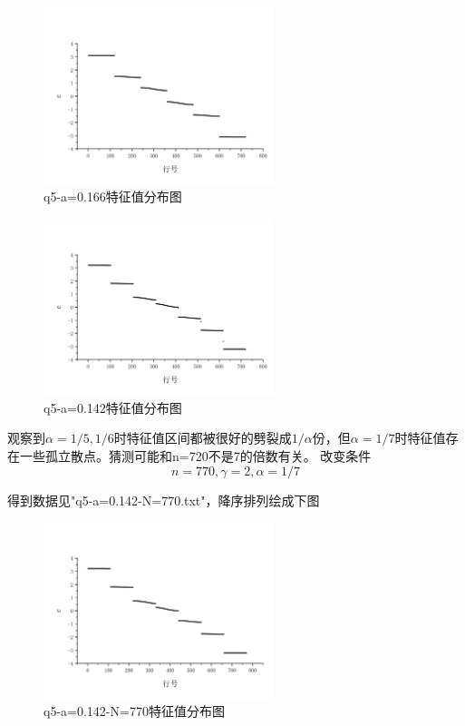 \documentclass[10pt, a4paper]{article}
\begin{document}
    \begin{figure}[H]
        \centering
        \includegraphics[width=0.6\textwidth]{q5-a=0.166特征值分布图.jpg}
        \caption{q5-a=0.166特征值分布图}\label{fig:q5-a=0.166特征值分布图}
    \end{figure}

    \begin{figure}[H]
        \centering
        \includegraphics[width=0.6\textwidth]{q5-a=0.142特征值分布图.jpg}
        \caption{q5-a=0.142特征值分布图}\label{fig:q5-a=0.142特征值分布图}
    \end{figure}

    观察到$\alpha=1/5,1/6$时特征值区间都被很好的劈裂成$1/\alpha$份，但$\alpha=1/7$时特征值存在一些孤立散点。猜测可能和n=720不是7的倍数有关。
    改变条件
    \[n=770,\gamma=2,\alpha=1/7\]

    得到数据见"q5-a=0.142-N=770.txt"，降序排列绘成下图

    \begin{figure}[H]
        \centering
        \includegraphics[width=0.6\textwidth]{q5-a=0.142-N=770特征值分布图.jpg}
        \caption{q5-a=0.142-N=770特征值分布图}\label{fig:q5-a=0.142-N=770特征值分布图}
    \end{figure}
\end{document}
